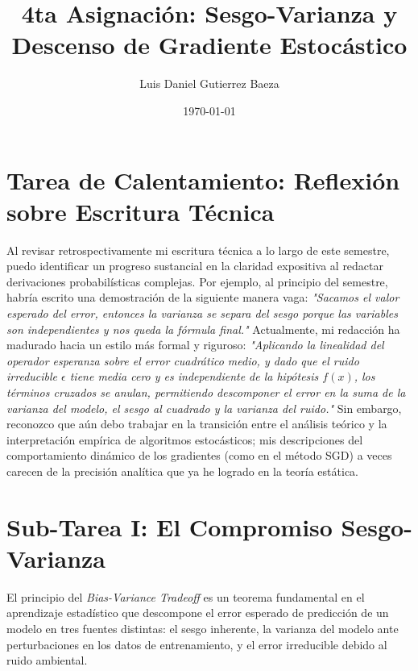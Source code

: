 \documentclass[12pt]{article}
\title{4ta Asignación: Sesgo-Varianza y Descenso de Gradiente Estocástico}
\author{Luis Daniel Gutierrez Baeza}
\date{\today}
\begin{document}
\maketitle

\begin{center}
\end{center}
\vspace{0.5cm}

\section*{Tarea de Calentamiento: Reflexión sobre Escritura Técnica}
Al revisar retrospectivamente mi escritura técnica a lo largo de este semestre, puedo identificar un progreso sustancial en la claridad expositiva al redactar derivaciones probabilísticas complejas. Por ejemplo, al principio del semestre, habría escrito una demostración de la siguiente manera vaga: \textit{"Sacamos el valor esperado del error, entonces la varianza se separa del sesgo porque las variables son independientes y nos queda la fórmula final."} Actualmente, mi redacción ha madurado hacia un estilo más formal y riguroso: \textit{"Aplicando la linealidad del operador esperanza sobre el error cuadrático medio, y dado que el ruido irreducible $\epsilon$ tiene media cero y es independiente de la hipótesis $f(x)$, los términos cruzados se anulan, permitiendo descomponer el error en la suma de la varianza del modelo, el sesgo al cuadrado y la varianza del ruido."} Sin embargo, reconozco que aún debo trabajar en la transición entre el análisis teórico y la interpretación empírica de algoritmos estocásticos; mis descripciones del comportamiento dinámico de los gradientes (como en el método SGD) a veces carecen de la precisión analítica que ya he logrado en la teoría estática.

\section*{Sub-Tarea I: El Compromiso Sesgo-Varianza}
El principio del \textit{Bias-Variance Tradeoff} es un teorema fundamental en el aprendizaje estadístico que descompone el error esperado de predicción de un modelo en tres fuentes distintas: el sesgo inherente, la varianza del modelo ante perturbaciones en los datos de entrenamiento, y el error irreducible debido al ruido ambiental.
\end{document}
